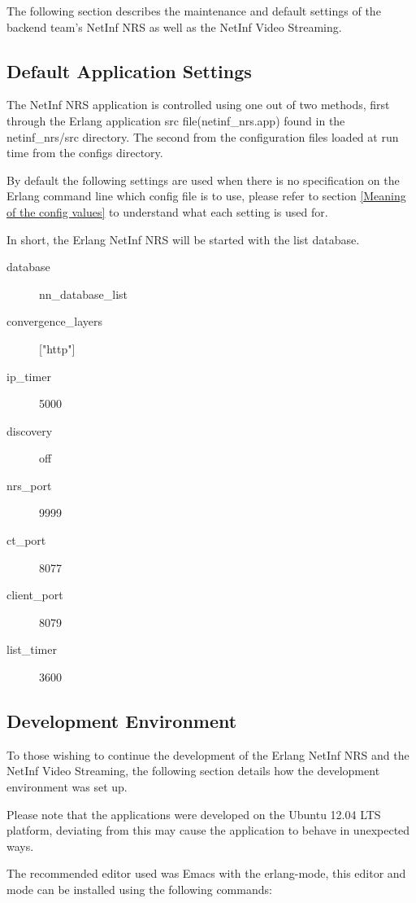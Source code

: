 The following section describes the maintenance and default settings of the backend team's NetInf NRS as well as the NetInf Video Streaming.

\subsection{Default Application Settings}

The NetInf NRS application is controlled using one out of two methods, first through the Erlang application src file(netinf\_nrs.app) 
found in the netinf\_nrs/src directory. The second from the configuration files loaded at run time from the configs directory. 

By default the following settings are used when there is no specification on the Erlang command line which config file is to use, 
please refer to section \ref{Meaning of the config values} to understand what each setting is used for. 

In short, the Erlang NetInf NRS will be started with the list database.

\begin{description}
\item[database]
nn\_database\_list
\item[convergence\_layers]
["http"]
\item[ip\_timer]
5000
\item[discovery]
off
\item[nrs\_port]
9999
\item[ct\_port]
8077
\item[client\_port]
8079
\item[list\_timer]
3600
\end{description}

\subsection {Development Environment}

To those wishing to continue the development of the Erlang NetInf NRS and the NetInf Video Streaming, the following 
section details how the development environment was set up. 

Please note that the applications were developed on the Ubuntu 12.04 LTS platform, deviating from this may cause the 
application to behave in unexpected ways.

The recommended editor used was Emacs with the erlang-mode, this editor and mode can be installed using the following commands:

